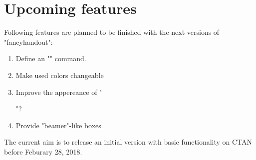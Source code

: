 \documentclass[11pt]{ltxdoc}
\begin{document}
	\section{Upcoming features}
	Following features are planned to be finished with the next versions of "fancyhandout":
	\begin{enumerate}
		\item
			Define an "\institute" command.
		
		\item
			Make used colors changeable
		
		\item
			Improve the appereance of "\maketitle"?
		
		\item
			Provide "beamer"-like boxes
	\end{enumerate}
	
	The current aim is to release an initial version with basic functionality on CTAN before Feburary 28, 2018.
\end{document}
